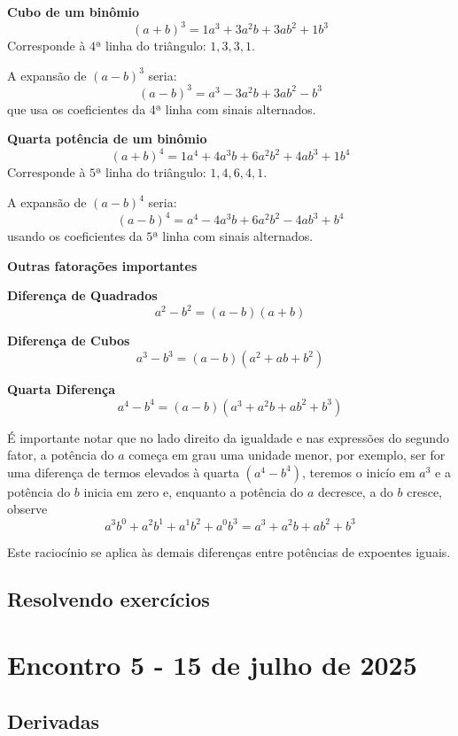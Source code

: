 \documentclass[12pt,openright,twoside,a4paper]{article}
\theoremstyle{definition}
\begin{document}
\begin{snugshade}
		\textbf{Cubo de um binômio}
		\[ (a + b)^3 = \boxed{1}a^3 + \boxed{3}a^2b + \boxed{3}ab^2 + \boxed{1}b^3 \]
		Corresponde à $4$ª linha do triângulo: $1, 3, 3, 1$.
		
		A expansão de $(a - b)^3$ seria:
		\[ (a - b)^3 = a^3 - 3a^2b + 3ab^2 - b^3 \]
		que usa os coeficientes da 4ª linha com sinais alternados.
		
		\textbf{Quarta potência de um binômio}
		\[ (a + b)^4 = \boxed{1}a^4 + \boxed{4}a^3b + \boxed{6}a^2b^2 + \boxed{4}ab^3 + \boxed{1}b^4 \]
		Corresponde à $5$ª linha do triângulo: $1, 4, 6, 4, 1$.
		
		A expansão de $(a - b)^4$ seria:
		\[ (a - b)^4 = a^4 - 4a^3b + 6a^2b^2 - 4ab^3 + b^4 \]
		usando os coeficientes da $5$ª linha com sinais alternados.
		
		\textbf{\large{Outras fatorações importantes}}
		
		\textbf{Diferença de Quadrados}
		\[ a^2 - b^2 = (a - b)(a + b) \]
		
		\textbf{Diferença de Cubos}
		\[ a^3 - b^3 = (a - b)(a^2 + ab + b^2) \]
		
		\textbf{Quarta Diferença}
		\[ a^4 - b^4 = (a - b)(a^3 + a^2b + ab^2 + b^3) \]
		
		É importante notar que no lado direito da igualdade e nas expressões do segundo fator, a potência do $a$ começa em grau uma unidade menor, por exemplo, ser for uma diferença de termos elevados à quarta $(a^{4} - b^{4})$, teremos o inicío em $a^{3}$ e a potência do $b$ inicia em zero e, enquanto a potência do $a$ decresce, a do $b$ cresce, observe
		\[a^3b^{0} + a^2b^{1} + a^{1}b^2 + a^{0}b^3 = a^3 + a^2b + ab^2 + b^3\]
		
		Este raciocínio se aplica às demais diferenças entre potências de expoentes iguais.
	\end{snugshade}
	
	\subsection{Resolvendo exercícios}
	
	\pagebreak
	\section{Encontro 5 - 15 de julho de 2025}
	
	\subsection{Derivadas}
	
\end{document}
